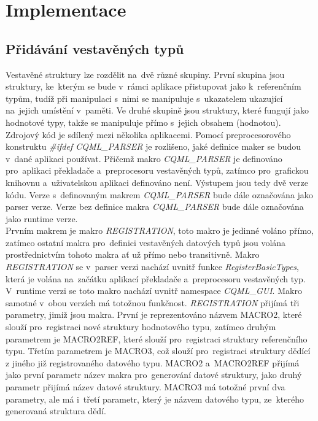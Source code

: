 \documentclass[11pt,twoside,a4paper]{book}
\begin{document}
\chapter{\label{CH:Impl}Implementace}
\section{\label{SEC:header}Přidávání vestavěných typů}
Vestavěné struktury lze rozdělit na~dvě různé skupiny. První skupina jsou struktury, ke~kterým se bude v~rámci aplikace přistupovat jako k~referenčním typům, tudíž při manipulaci s~nimi se manipuluje s~ukazatelem ukazující na~jejich umístění v~paměti. Ve druhé skupině jsou struktury, které fungují jako hodnotové typy, takže se manipuluje přímo s~jejich obsahem (hodnotou).\\
Zdrojový kód je sdílený mezi několika aplikacemi. Pomocí preprocesorového konstruktu \textit{\#ifdef CQML\_PARSER} je rozlišeno, jaké definice maker se budou v~dané aplikaci používat. Přičemž makro \textit{CQML\_PARSER} je definováno pro~aplikaci překladače a~preprocesoru vestavěných typů, zatímco pro~grafickou knihovnu a~uživatelskou aplikaci definováno není. Výstupem jsou tedy dvě verze kódu. Verze s~definovaným makrem \textit{CQML\_PARSER} bude dále označována jako parser verze. Verze bez definice makra \textit{CQML\_PARSER} bude dále označována jako runtime verze.\\
Prvním makrem je makro \textit{REGISTRATION}, toto makro je jedinné voláno přímo, zatímco ostatní makra pro~definici vestavěných datových typů jsou volána prostřednictvím tohoto makra ať už přímo nebo transitivně. Makro \textit{REGISTRATION} se v~parser verzi nachází uvnitř funkce \textit{RegisterBasicTypes}, která je volána na~začátku aplikací překladače a~preprocesoru vestavěných typ. V~runtime verzi se toto makro nachází uvnitř namespace \textit{CQML}\_\textit{GUI}. Makro samotné v~obou verzích má totožnou funkčnost. \textit{REGISTRATION} přijímá tři parametry, jimiž jsou makra. První je reprezentováno názvem MACRO2, které slouží pro~registraci nové struktury hodnotového typu, zatímco druhým parametrem je MACRO2REF, které slouží pro~registraci struktury referenčního typu. Třetím parametrem je MACRO3, což slouží pro~registraci struktury dědící z jiného již registrovaného datového typu. MACRO2 a~MACRO2REF přijímá jako první parametr název makra pro~generování datové struktury, jako druhý parametr přijímá název datové struktury. MACRO3 má totožné první dva parametry, ale má i~třetí parametr, který je názvem datového typu, ze~kterého generovaná struktura dědí. \\
\end{document}

